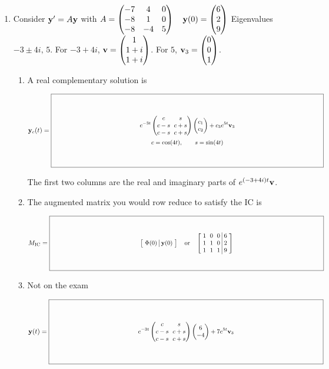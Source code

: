 \documentclass[11pt,letterpaper]{article}
\newcommand{\keybox}[3]{%
  \vcenter{\hbox{$\boxed{\parbox[c][#2][c]{#1}{\centering\small
    \setlength{\arraycolsep}{3pt}\ensuremath{\displaystyle #3}}}$}}}
\begin{document}
\begin{enumerate}
\newpage
\item Consider $\mathbf{y}'=A\mathbf{y}$ with
$A=\begin{pmatrix}-7&4&0\\-8&1&0\\-8&-4&5\end{pmatrix}\quad \mathbf{y}(0)=\begin{pmatrix}6\\2\\9\end{pmatrix}$\newline
Eigenvalues $-3\pm4i,\,5$. \quad For $-3+4i$, $\mathbf{v}=\begin{pmatrix}1\\1+i\\1+i\end{pmatrix}$. \quad For $5$, $\mathbf{v}_3=\begin{pmatrix}0\\0\\1\end{pmatrix}$.
\begin{enumerate}
\item A real complementary solution is
\par $\vect{y}_c(t)=\keybox{5.65in}{1.45in}{\begin{gathered}e^{-3t}\begin{pmatrix}c&s\\c-s&c+s\\c-s&c+s\end{pmatrix}\begin{pmatrix}c_1\\c_2\end{pmatrix}+c_3e^{5t}\vect{v}_3\\c=\cos(4t),\qquad s=\sin(4t)\end{gathered}}$
\par{\footnotesize The first two columns are the real and imaginary parts of $e^{(-3+4i)t}\mathbf{v}$.}
\vfill
\item The augmented matrix you would row reduce to satisfy the IC is
\par $M_{\mathrm{IC}}=\keybox{5.65in}{1.05in}{\left[\begin{array}{c|c}\Phi(0)&\vect{y}(0)\end{array}\right]
\quad\text{or}\quad\left[\begin{array}{rrr|r}1&0&0&6\\1&1&0&2\\1&1&1&9\end{array}\right]}$
\vfill
\item Not on the exam
\par $\vect{y}(t)=\keybox{5.65in}{1.25in}{e^{-3t}\begin{pmatrix}c&s\\c-s&c+s\\c-s&c+s\end{pmatrix}\begin{pmatrix}6\\-4\end{pmatrix}+7e^{5t}\vect{v}_3}$
\end{enumerate}
\end{enumerate}
\end{document}

